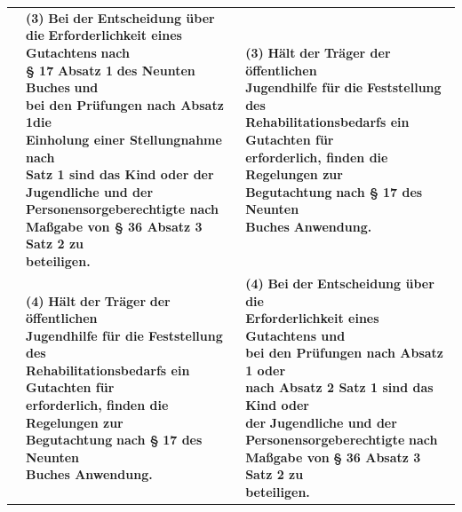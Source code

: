 \documentclass[10pt,a4paper,landscape]{article}
\begin{document}
\begin{longtable}{|L{8.2cm}|L{8.2cm}|L{8.2cm}|}
\hhline{|---|}
 & \textbf{(3) }\textbf{\textcolor{diffred}{Bei}}\textbf{ der }\textbf{\textcolor{diffred}{Entscheidung über}}\textbf{ die} \newline \textbf{\textcolor{diffred}{Erforderlichkeit eines Gutachtens}}\textbf{ nach  \newline \S{} 17 }\textbf{\textcolor{diffred}{Absatz 1}}\textbf{ des Neunten Buches }\textbf{\textcolor{diffred}{und  \newline bei den Prüfungen nach Absatz 1die  \newline Einholung einer Stellungnahme nach  \newline Satz 1 sind das Kind oder der  \newline Jugendliche und der  \newline Personensorgeberechtigte nach  \newline Maßgabe von \S{} 36 Absatz 3 Satz 2 zu  \newline beteiligen.}} & \textbf{(3)} \textbf{\textcolor{diffgreen}{Hält}}\textbf{ der }\textbf{\textcolor{diffgreen}{Träger der öffentlichen  \newline Jugendhilfe für}}\textbf{ die }\textbf{\textcolor{diffgreen}{Feststellung des  \newline Rehabilitationsbedarfs ein Gutachten für  \newline erforderlich, finden die Regelungen zur  \newline Begutachtung}}\textbf{ nach \S{} 17 des Neunten  \newline Buches }\textbf{\textcolor{diffgreen}{Anwendung.}} \\
\hhline{|---|}
 & \textbf{(4) }\textbf{\textcolor{diffred}{Hält}}\textbf{ der }\textbf{\textcolor{diffred}{Träger}}\textbf{ der }\textbf{\textcolor{diffred}{öffentlichen  \newline Jugendhilfe für die Feststellung des  \newline Rehabilitationsbedarfs ein Gutachten für  \newline erforderlich, finden die Regelungen zur  \newline Begutachtung}}\textbf{ nach \S{} }\textbf{\textcolor{diffred}{17 des Neunten  \newline Buches Anwendung.}} & \textbf{(4) }\textbf{\textcolor{diffgreen}{Bei}}\textbf{ der }\textbf{\textcolor{diffgreen}{Entscheidung über die  \newline Erforderlichkeit eines Gutachtens und  \newline bei den Prüfungen nach Absatz 1 oder  \newline nach Absatz 2 Satz 1 sind das Kind oder}}\textbf{  \newline der }\textbf{\textcolor{diffgreen}{Jugendliche und der  \newline Personensorgeberechtigte}}\textbf{ nach} \newline \textbf{\textcolor{diffgreen}{Maßgabe von}}\textbf{ \S{} }\textbf{\textcolor{diffgreen}{36 Absatz 3 Satz 2 zu  \newline beteiligen.}} \\

\end{longtable}
\end{document}
